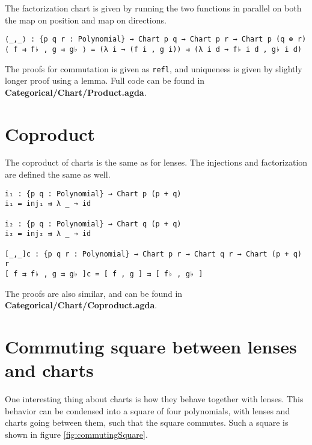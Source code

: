 The factorization chart is given by running the two functions in parallel on both the map on position and map on directions.

\begin{verbatim}
⟨_,_⟩ : {p q r : Polynomial} → Chart p q → Chart p r → Chart p (q ⊗ r)
⟨ f ⇉ f♭ , g ⇉ g♭ ⟩ = (λ i → (f i , g i)) ⇉ (λ i d → f♭ i d , g♭ i d)
\end{verbatim}

The proofs for commutation is given as \texttt{refl}, and uniqueness is given by slightly longer proof using a lemma. Full code can be found in \textbf{Categorical/Chart/Product.agda}.


\section{Coproduct}
The coproduct of charts is the same as for lenses. The injections and factorization are defined the same as well.
\begin{verbatim}
i₁ : {p q : Polynomial} → Chart p (p + q)
i₁ = inj₁ ⇉ λ _ → id

i₂ : {p q : Polynomial} → Chart q (p + q)
i₂ = inj₂ ⇉ λ _ → id

[_,_]c : {p q r : Polynomial} → Chart p r → Chart q r → Chart (p + q) r
[ f ⇉ f♭ , g ⇉ g♭ ]c = [ f , g ] ⇉ [ f♭ , g♭ ]
\end{verbatim}

The proofs are also similar, and can be found in \textbf{Categorical/Chart/Coproduct.agda}.

\section{Commuting square between lenses and charts}
One interesting thing about charts is how they behave together with lenses. This behavior can be condensed into a square of four polynomials, with lenses and charts going between them, such that the square commutes. Such a square is shown in figure \ref{fig:commutingSquare}.


